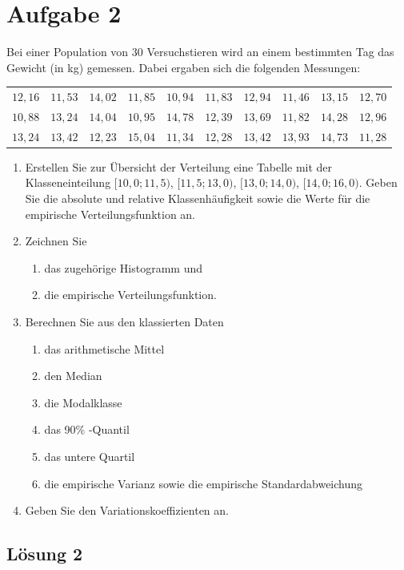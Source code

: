 \documentclass[main.tex]{subfiles}
\begin{document}
\section{Aufgabe 2}
Bei einer Population von $30$ Versuchstieren wird an einem bestimmten Tag das Gewicht (in kg) gemessen. Dabei ergaben sich die folgenden Messungen:
\begin{center}
\begin{tabular}{cccccccccc}
$12,16$ & $11,53$ & $14,02$ & $11,85$ & $10,94$ & $11,83$ & $12,94$ & $11,46$ & $13,15$ & $12,70$ \\
$10,88$ & $13,24$ & $14,04$ & $10,95$ & $14,78$ & $12,39$ & $13,69$ & $11,82$ & $14,28$ & $12,96$ \\
$13,24$ & $13,42$ & $12,23$ & $15,04$ & $11,34$ & $12,28$ & $13,42$ & $13,93$ & $14,73$ & $11,28$
\end{tabular}
\end{center}
\begin{enumerate}
\item Erstellen Sie zur Übersicht der Verteilung eine Tabelle mit der Klasseneinteilung $[10,0;11,5)$, $[11,5;13,0)$, $[13,0;14,0)$, $[14,0;16,0)$. Geben Sie die absolute und relative Klassenhäufigkeit sowie die Werte für die empirische Verteilungsfunktion an.
\item Zeichnen Sie
\begin{enumerate}
\item das zugehörige Histogramm und
\item die empirische Verteilungsfunktion.
\end{enumerate}
\item Berechnen Sie aus den klassierten Daten
\begin{enumerate}
\item das arithmetische Mittel
\item den Median
\item die Modalklasse
\item das 90\% -Quantil
\item das untere Quartil
\item die empirische Varianz sowie die empirische Standardabweichung
\end{enumerate}
\item Geben Sie den Variationskoeffizienten an.
\end{enumerate}

\subsection{Lösung 2}
\end{document}
